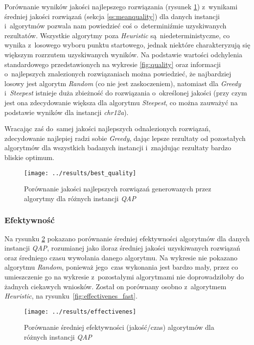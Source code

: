 \documentclass{article}
\begin{document}
			Porównanie wyników jakości najlepszego rozwiązania (rysunek \ref{fig:best_quality}) z~wynikami średniej jakości rozwiązań (sekcja \ref{ss:meanquality}) dla danych instancji i~algorytmów pozwala nam powiedzieć coś o~determiniźmie uzyskiwanych rezultatów. Wszystkie algorytmy poza \emph{Heuristic} są~niedeterministyczne, co wynika z~losowego wyboru punktu startowego, jednak niektóre charakteryzują się większym rozrzutem uzyskiwanych wyników. Na podstawie wartości odchylenia standardowego przedstawionych na wykresie \ref{fig:quality} oraz informacji o~najlepszych znalezionych rozwiązaniach można powiedzieć, że najbardziej losowy jest algorytm \emph{Random} (co nie jest zaskoczeniem), natomiast dla \emph{Greedy} i~\emph{Steepest} istnieje duża zbieżność do rozwiązania o~określonej jakości (przy czym jest ona zdecydowanie większa dla algorytmu \emph{Steepest}, co można zauważyć na podstawie wyników dla instancji \emph{chr12a}).


			Wracając zaś do~samej jakości najlepszych odnalezionych rozwiązań, zdecydowanie najlepiej radzi sobie \emph{Greedy}, dając lepsze rezultaty od pozostałych algorytmów dla wszystkich badanych instancji i~znajdując rezultaty bardzo bliskie optimum.

		 	\begin{figure}[h]
				\texttt{[image: ../results/best\_quality]}
				\caption{Porównanie jakości najlepszych rozwiązań generowanych przez algorytmy dla różnych instancji \emph{QAP}\label{fig:best_quality}}
			\end{figure}

		\subsubsection{Efektywność}

			Na rysunku \ref{fig:effectivenes} pokazano porównanie średniej efektywności algorytmów dla danych instancji \emph{QAP}, rozumianej jako iloraz średniej jakości uzyskiwanych rozwiązań oraz średniego czasu wywołania danego algorytmu. Na wykresie nie pokazano algorytmu \emph{Random}, ponieważ jego~czas wykonania jest bardzo mały, przez co umieszczenie go na wykresie z~pozostałymi algorytmami nie doprowadziłoby do żadnych ciekawych wniosków. Został on porównany osobno z~algorytmem \emph{Heuristic}, na rysunku~\ref{fig:effectivenes_fast}.



			\begin{figure}[h]
				\texttt{[image: ../results/effectivenes]}
				\caption{Porównanie średniej efektywności (jakość/czas) algorytmów dla różnych instancji \emph{QAP}\label{fig:effectivenes}}
			\end{figure}
\end{document}

